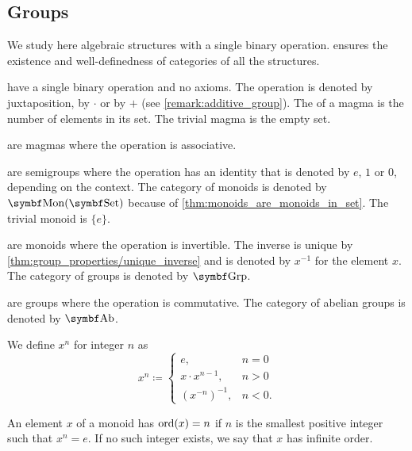 \subsection{Groups}\label{subsec:groups}

\begin{definition}\label{def:magma}
  We study here algebraic structures with a single binary operation.  ensures the existence and well-definedness of categories of all the structures.

  \begin{itemize}
      have a single binary operation and no axioms. The operation is denoted by juxtaposition, by \( \cdot \) or by \( + \) (see \cref{remark:additive_group}). The  of a magma is the number of elements in its set. The trivial magma is the empty set.

      are magmas where the operation is associative.

      are semigroups where the operation has an identity that is denoted by \( e \), \( 1 \) or \( 0 \), depending on the context. The category of monoids is denoted by \( \Cat{Mon}(\Cat{Set}) \) because of \cref{thm:monoids_are_monoids_in_set}. The trivial monoid is \( \{ e \} \).

      are monoids where the operation is invertible. The inverse is unique by \cref{thm:group_properties/unique_inverse} and is denoted by \( x^{-1} \) for the element \( x \). The category of groups is denoted by \( \Cat{Grp} \).

      are groups where the operation is commutative. The category of abelian groups is denoted by \( \Cat{Ab} \).
  \end{itemize}

  We define \( x^n \) for integer \( n \) as
  \begin{equation*}
    x^n \coloneqq \begin{cases}
      e, &n = 0 \\
      x \cdot x^{n-1}, &n > 0 \\
      (x^{-n})^{-1}, &n < 0.
    \end{cases}
  \end{equation*}

  An element \( x \) of a monoid has  \( \operatorname{ord}(x) = n \) if \( n \) is the smallest positive integer such that \( x^n = e \). If no such integer exists, we say that \( x \) has infinite order.
\end{definition}


